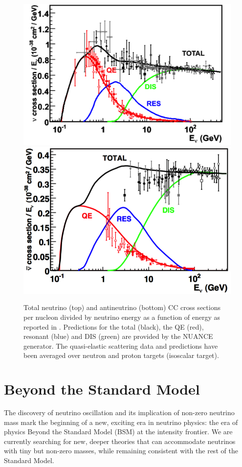 \begin{figure}[hbpt]
\centering
\includegraphics[scale=0.6]{Chapter-1/Images/NuCrossSec.png}
\includegraphics[scale=0.95]{Chapter-1/Images/AntiNuCrossSec.png}
\caption{Total neutrino (top) and antineutrino (bottom) CC cross sections per nucleon divided by neutrino energy as a function of energy as reported in \cite{RevModPhys.84.1307}. Predictions for the total (black), the QE (red), resonant (blue) and DIS (green) are provided by the NUANCE generator. The quasi-elastic scattering data and predictions have been averaged over neutron and proton targets (isoscalar target).}
\label{fig:nuXS}
\end{figure}


\section{Beyond the Standard Model}\label{ch:BMS}
The discovery of neutrino oscillation and its implication of non-zero neutrino mass mark  the beginning of a new, exciting era in neutrino physics: the era of physics Beyond the Standard Model (BSM) at the intensity frontier.
We are currently searching for new, deeper theories that can accommodate neutrinos with tiny but non-zero masses, while remaining consistent with the rest of the Standard Model. 

